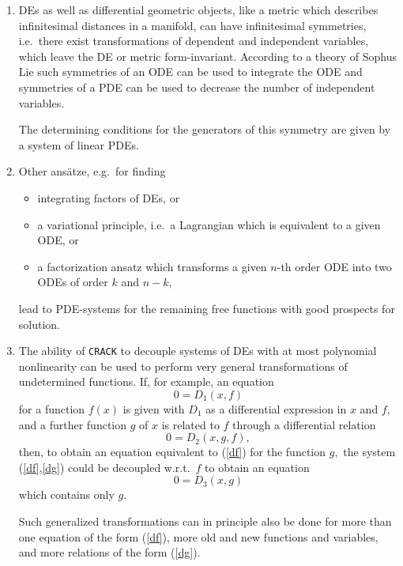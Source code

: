 \begin{enumerate}
 \item
  DEs as well as differential geometric objects, like a metric which
  describes infinitesimal distances in a manifold, can have
  infinitesimal symmetries, i.e.\ there exist transformations of dependent
  and independent variables, which leave the DE or metric
  form-invariant. According to a theory of Sophus Lie such
  symmetries of an ODE can be used to integrate the
  ODE and symmetries of a PDE can be used to decrease the number
  of independent variables.

    The determining conditions for the generators of this
  symmetry are given by a system of linear PDEs.

\item
  Other ans\"atze, e.g.\ for finding
\begin{itemize}
\item integrating factors of DEs, or
\item a variational principle, i.e.\ a Lagrangian which is equivalent
    to a given ODE, or
\item a factorization ansatz which transforms a given $n$-th order
    ODE into two ODEs of order $k$ and $n-k,$
\end{itemize}
  lead to PDE-systems for the remaining free functions with good
  prospects for solution.
\item
  The ability of {\tt CRACK} to decouple systems of DEs with at most polynomial
  nonlinearity can be used to perform very general transformations of
  undetermined functions. If, for example, an equation
\begin{equation}
        0 = D_1(x, f)             \label{df}
\end{equation}
  for a function $f(x)$ is given with $D_1$ as a differential
expression in $x$ and $f$, and a further function $g$ of $x$
is related to $f$ through a differential relation
\begin{equation}
        0 = D_2(x, g, f),          \label{dg}
\end{equation}
then, to obtain an equation equivalent to (\ref{df}) for the function $g,$
the system (\ref{df},\ref{dg}) could be decoupled w.r.t.\ $f$ to
obtain an equation
\[        0 = D_3(x, g)     \]
which contains only $g$.

    Such generalized transformations can in principle also be done for more
than one equation of the form (\ref{df}), more old and new functions and
variables, and more relations of the form (\ref{dg}).


\end{enumerate}
